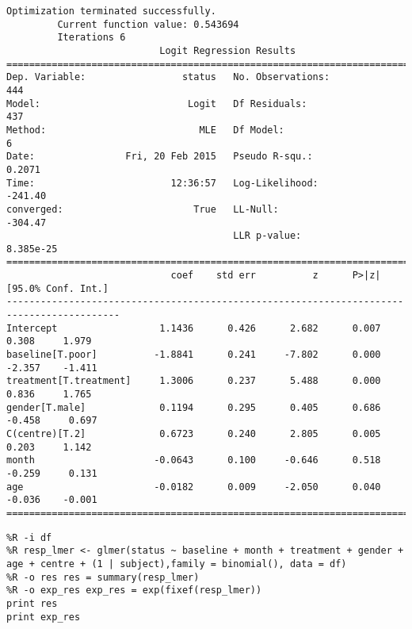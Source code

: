 \documentclass[12pt,fleqn]{article}\usepackage{../common}
\begin{document}
\begin{verbatim}
Optimization terminated successfully.
         Current function value: 0.543694
         Iterations 6
                           Logit Regression Results                           
==============================================================================
Dep. Variable:                 status   No. Observations:                  444
Model:                          Logit   Df Residuals:                      437
Method:                           MLE   Df Model:                            6
Date:                Fri, 20 Feb 2015   Pseudo R-squ.:                  0.2071
Time:                        12:36:57   Log-Likelihood:                -241.40
converged:                       True   LL-Null:                       -304.47
                                        LLR p-value:                 8.385e-25
==========================================================================================
                             coef    std err          z      P>|z|      [95.0% Conf. Int.]
------------------------------------------------------------------------------------------
Intercept                  1.1436      0.426      2.682      0.007         0.308     1.979
baseline[T.poor]          -1.8841      0.241     -7.802      0.000        -2.357    -1.411
treatment[T.treatment]     1.3006      0.237      5.488      0.000         0.836     1.765
gender[T.male]             0.1194      0.295      0.405      0.686        -0.458     0.697
C(centre)[T.2]             0.6723      0.240      2.805      0.005         0.203     1.142
month                     -0.0643      0.100     -0.646      0.518        -0.259     0.131
age                       -0.0182      0.009     -2.050      0.040        -0.036    -0.001
==========================================================================================
\end{verbatim}

\begin{verbatim}
%R -i df 
%R resp_lmer <- glmer(status ~ baseline + month + treatment + gender + age + centre + (1 | subject),family = binomial(), data = df)
%R -o res res = summary(resp_lmer)
%R -o exp_res exp_res = exp(fixef(resp_lmer))
print res
print exp_res
\end{verbatim}
\end{document}
